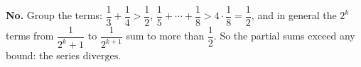 \textbf{No.} Group the terms: $\dfrac13+\dfrac14>\dfrac12$, $\dfrac15+\cdots+\dfrac18>4\cdot\dfrac18=\dfrac12$, and in general the $2^k$ terms from $\dfrac1{2^k+1}$ to $\dfrac1{2^{k+1}}$ sum to more than $\dfrac12$. So the partial sums exceed any bound: the series $\boxed{\text{diverges}}$.
